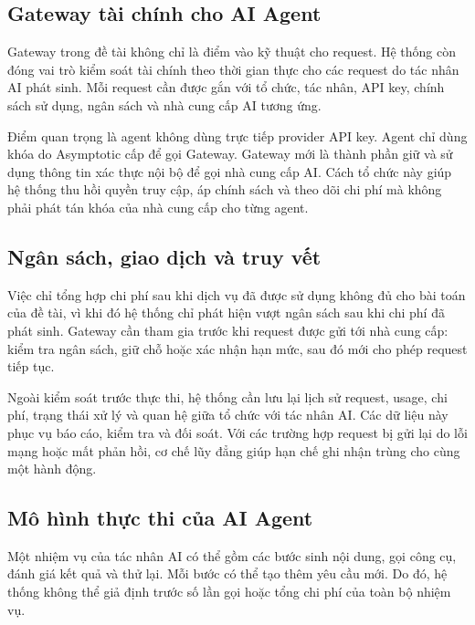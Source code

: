 
\subsection*{Gateway tài chính cho AI Agent}

Gateway trong đề tài không chỉ là điểm vào kỹ thuật cho request. Hệ thống còn đóng vai trò kiểm soát tài chính theo thời gian thực cho các request do tác nhân AI phát sinh. Mỗi request cần được gắn với tổ chức, tác nhân, API key, chính sách sử dụng, ngân sách và nhà cung cấp AI tương ứng.

Điểm quan trọng là agent không dùng trực tiếp provider API key. Agent chỉ dùng khóa do Asymptotic cấp để gọi Gateway. Gateway mới là thành phần giữ và sử dụng thông tin xác thực nội bộ để gọi nhà cung cấp AI. Cách tổ chức này giúp hệ thống thu hồi quyền truy cập, áp chính sách và theo dõi chi phí mà không phải phát tán khóa của nhà cung cấp cho từng agent.


\subsection*{Ngân sách, giao dịch và truy vết}

Việc chỉ tổng hợp chi phí sau khi dịch vụ đã được sử dụng không đủ cho bài toán của đề tài, vì khi đó hệ thống chỉ phát hiện vượt ngân sách sau khi chi phí đã phát sinh. Gateway cần tham gia trước khi request được gửi tới nhà cung cấp: kiểm tra ngân sách, giữ chỗ hoặc xác nhận hạn mức, sau đó mới cho phép request tiếp tục.

Ngoài kiểm soát trước thực thi, hệ thống cần lưu lại lịch sử request, usage, chi phí, trạng thái xử lý và quan hệ giữa tổ chức với tác nhân AI. Các dữ liệu này phục vụ báo cáo, kiểm tra và đối soát. Với các trường hợp request bị gửi lại do lỗi mạng hoặc mất phản hồi, cơ chế lũy đẳng giúp hạn chế ghi nhận trùng cho cùng một hành động.


\subsection*{Mô hình thực thi của AI Agent}

Một nhiệm vụ của tác nhân AI có thể gồm các bước sinh nội dung, gọi công cụ, đánh giá kết quả và thử lại. Mỗi bước có thể tạo thêm yêu cầu mới. Do đó, hệ thống không thể giả định trước số lần gọi hoặc tổng chi phí của toàn bộ nhiệm vụ.


